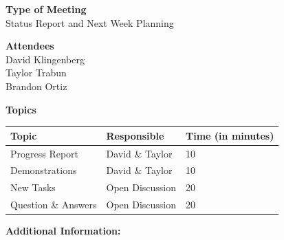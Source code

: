 \documentclass[pdftex,11pt]{article}
\begin{document}
{ \large \bfseries \hspace*{2 mm} Type of Meeting\\}
\hspace*{12 mm}  Status Report and  Next Week Planning
\vspace*{1.5mm}

{ \large \bfseries \hspace*{2 mm} Attendees\\}
\hspace*{12mm} David Klingenberg\\
\hspace*{12mm} Taylor Trabun\\
\hspace*{12mm} Brandon Ortiz\\
\vspace*{1.5mm}

{ \large \bfseries \noindent Topics}
\vspace*{2.5mm}

\begin{tabular}{| l | l | l |}
  \hline
  \bfseries Topic & \bfseries Responsible & \bfseries Time (in minutes) \\ \hline
  Progress Report  & David \& Taylor &  10 \\ \hline
  Demonstrations & David \& Taylor & 10 \\ \hline
  New Tasks & Open Discussion & 20 \\ \hline
  Question \&  Answers  & Open Discussion & 20 \\ 
  \hline
\end{tabular}

\vspace*{2.5mm}
{ \large \bfseries \noindent Additional Information:}
\end{document}
